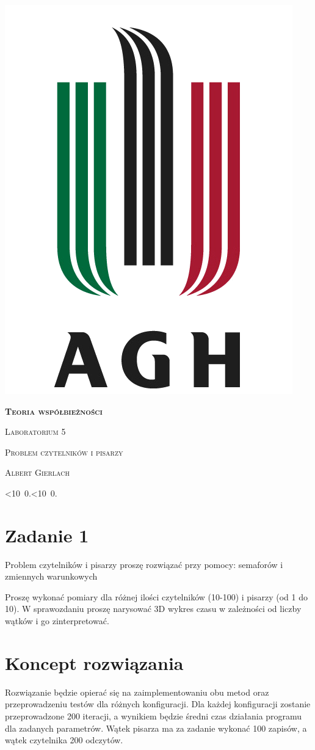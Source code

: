 \documentclass[12pt]{article}
\def\mydate{\leavevmode\hbox{\twodigits\day.\twodigits\month.\the\year}}
\def\twodigits#1{\ifnum#1<10 0\fi\the#1}
\begin{document}
\thispagestyle{empty}
\begin{center}
\begin{minipage}{0.75\linewidth}
    \centering
    \includegraphics[width=0.45\linewidth]{agh_logo2.png}
    \par
    \vspace{2cm}
    {\bfseries{\scshape{\Huge  Teoria współbieżności}}}
    \par
    \vspace{2cm}
    {\scshape{\Large Laboratorium 5}}
    \par
    \vspace{0.4cm}
    {\scshape{\Large Problem czytelników i pisarzy}}
    \par
    \vspace{3cm}

    {\scshape{\Large Albert Gierlach}}\par
    \vspace{1cm}

    {\Large \mydate}
\end{minipage}
\end{center}
\clearpage



\section{Zadanie 1}
Problem czytelników i pisarzy proszę rozwiązać przy pomocy: semaforów i zmiennych warunkowych

Proszę wykonać pomiary dla różnej ilości czytelników (10-100) i pisarzy (od 1 do 10).
W sprawozdaniu proszę narysować 3D wykres czasu w zależności od liczby wątków i go zinterpretować.

  
\section{Koncept rozwiązania}
Rozwiązanie będzie opierać się na zaimplementowaniu obu metod oraz przeprowadzeniu testów dla różnych konfiguracji. Dla każdej konfiguracji zostanie przeprowadzone 200 iteracji, a wynikiem będzie średni czas działania programu dla zadanych parametrów. Wątek pisarza ma za zadanie wykonać 100 zapisów, a wątek czytelnika 200 odczytów.
\end{document}
